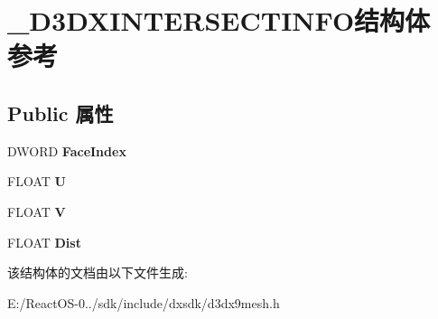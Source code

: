 \hypertarget{struct___d3_d_x_i_n_t_e_r_s_e_c_t_i_n_f_o}{}\section{\+\_\+\+D3\+D\+X\+I\+N\+T\+E\+R\+S\+E\+C\+T\+I\+N\+F\+O结构体 参考}
\label{struct___d3_d_x_i_n_t_e_r_s_e_c_t_i_n_f_o}
\subsection*{Public 属性}
\begin{DoxyCompactItemize}
\item 
\mbox{\label{struct___d3_d_x_i_n_t_e_r_s_e_c_t_i_n_f_o_ad8e378b866b4c69454c790f04dfdc21a}} 
D\+W\+O\+RD {\bfseries Face\+Index}
\item 
\mbox{\label{struct___d3_d_x_i_n_t_e_r_s_e_c_t_i_n_f_o_a3a1d1a1763dbc093f88ff1d30ad2a8a7}} 
F\+L\+O\+AT {\bfseries U}
\item 
\mbox{\label{struct___d3_d_x_i_n_t_e_r_s_e_c_t_i_n_f_o_a660f1da3ded7704c76eadb138766c8aa}} 
F\+L\+O\+AT {\bfseries V}
\item 
\mbox{\label{struct___d3_d_x_i_n_t_e_r_s_e_c_t_i_n_f_o_ab4f4c22d9c93b0d8161d4243f2c91c32}} 
F\+L\+O\+AT {\bfseries Dist}
\end{DoxyCompactItemize}


该结构体的文档由以下文件生成\+:\begin{DoxyCompactItemize}
\item 
E\+:/\+React\+O\+S-\/0../sdk/include/dxsdk/d3dx9mesh.\+h\end{DoxyCompactItemize}
